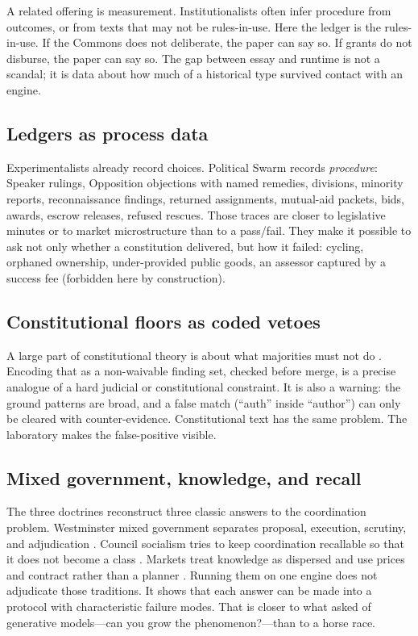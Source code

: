 \documentclass[11pt,a4paper]{article}
\begin{document}
A related offering is measurement. Institutionalists often infer procedure from
outcomes, or from texts that may not be rules-in-use. Here the ledger is the
rules-in-use. If the Commons does not deliberate, the paper can say so. If grants do
not disburse, the paper can say so. The gap between essay and runtime is not a scandal;
it is data about how much of a historical type survived contact with an engine.

\subsection{Ledgers as process data}

Experimentalists already record choices. Political Swarm records \emph{procedure}:
Speaker rulings, Opposition objections with named remedies, divisions, minority reports,
reconnaissance findings, returned assignments, mutual-aid packets, bids, awards, escrow
releases, refused rescues. Those traces are closer to legislative minutes or to market
microstructure than to a pass/fail. They make it possible to ask not only whether a
constitution delivered, but how it failed: cycling, orphaned ownership, under-provided
public goods, an assessor captured by a success fee (forbidden here by construction).

\subsection{Constitutional floors as coded vetoes}

A large part of constitutional theory is about what majorities must not do
\citep{madison1788,dicey1885,buchanan1962}. Encoding that as a non-waivable finding set,
checked before merge, is a precise analogue of a hard judicial or constitutional
constraint. It is also a warning: the ground patterns are broad, and a false match
(``auth'' inside ``author'') can only be cleared with counter-evidence. Constitutional
text has the same problem. The laboratory makes the false-positive visible.

\subsection{Mixed government, knowledge, and recall}

The three doctrines reconstruct three classic answers to the coordination problem.
Westminster mixed government separates proposal, execution, scrutiny, and adjudication
\citep{bagehot1867,montesquieu1748}. Council socialism tries to keep coordination
recallable so that it does not become a class \citep{marx1871,pannekoek1950}. Markets
treat knowledge as dispersed and use prices and contract rather than a planner
\citep{hayek1945,coase1937}. Running them on one engine does not adjudicate those
traditions. It shows that each answer can be made into a protocol with characteristic
failure modes. That is closer to what \citet{epstein1999} asked of generative models---can
you grow the phenomenon?---than to a horse race.
\end{document}
